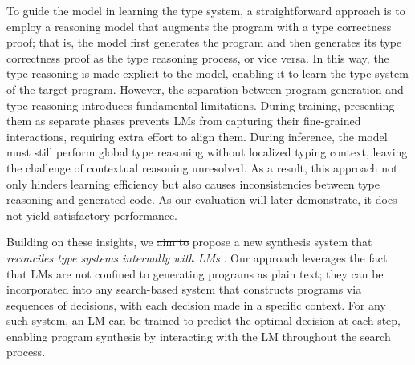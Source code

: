\documentclass[manuscript,screen]{acmart}
\makeatletter
\providecommand{\DIFadd}[1]{{\protect\color{blue}\uwave{#1}}} %
\providecommand{\DIFdel}[1]{{\protect\color{red}\sout{#1}}} %
\providecommand{\DIFaddbegin}{} %
\providecommand{\DIFaddend}{} %
\providecommand{\DIFdelbegin}{} %
\providecommand{\DIFdelend}{} %
\providecommand{\DIFscaledelfig}{0.5}
\newlength{\DIFdelgraphicswidth} %
\newlength{\DIFdelgraphicsheight} %
\providecommand{\DIFaddincludegraphics}[2][]{{\color{blue}\fbox{\DIFOincludegraphics[#1]{#2}}}} %
\providecommand{\DIFdelincludegraphics}[2][]{%
\sbox{\DIFdelgraphicsbox}{\DIFOincludegraphics[#1]{#2}}%
\settoboxwidth{\DIFdelgraphicswidth}{\DIFdelgraphicsbox} %
\settoboxtotalheight{\DIFdelgraphicsheight}{\DIFdelgraphicsbox} %
\scalebox{\DIFscaledelfig}{%
\parbox[b]{\DIFdelgraphicswidth}{\usebox{\DIFdelgraphicsbox}\\[-\baselineskip] \rule{\DIFdelgraphicswidth}{0em}}\llap{\resizebox{\DIFdelgraphicswidth}{\DIFdelgraphicsheight}{%
\setlength{\unitlength}{\DIFdelgraphicswidth}%
\begin{picture}(1,1)%
\thicklines\linethickness{2pt} %
{\color[rgb]{1,0,0}\put(0,0){\framebox(1,1){}}}%
{\color[rgb]{1,0,0}\put(0,0){\line( 1,1){1}}}%
{\color[rgb]{1,0,0}\put(0,1){\line(1,-1){1}}}%
\end{picture}%
}\hspace*{3pt}}} %
} %
\DeclareRobustCommand{\DIFaddbegin}{\DIFOaddbegin \let\includegraphics\DIFaddincludegraphics} %
\DeclareRobustCommand{\DIFaddend}{\DIFOaddend \let\includegraphics\DIFOincludegraphics} %
\DeclareRobustCommand{\DIFdelbegin}{\DIFOdelbegin \let\includegraphics\DIFdelincludegraphics} %
\DeclareRobustCommand{\DIFdelend}{\DIFOaddend \let\includegraphics\DIFOincludegraphics} %
\let\sout@orig\sout %
\renewcommand{\sout}[1]{\ifmmode\text{\sout@orig{\ensuremath{#1}}}\else\sout@orig{#1}\fi} %
\makeatother
\begin{document}
To guide the model in learning the type system, a straightforward approach is to employ a reasoning model that augments the program with a type correctness proof; that is, the model first generates the program and then generates its type correctness proof as the type reasoning process, or vice versa. In this way, the type reasoning is made explicit to the model, enabling it to learn the type system of the target program.
%
However, the separation between program generation and type reasoning introduces fundamental limitations. During training, presenting them as separate phases prevents LMs from capturing their fine-grained interactions, requiring extra effort to align them. During inference, the model must still perform global type reasoning without \DIFaddbegin \DIFadd{a }\DIFaddend localized typing context, leaving the challenge of contextual reasoning unresolved.
%
As a result, this approach not only hinders learning efficiency but also causes inconsistencies between type reasoning and generated code. As our evaluation will later demonstrate, it does not yield satisfactory performance.

Building on these insights, we \DIFdelbegin \DIFdel{aim to }\DIFdelend propose a new synthesis system that \emph{reconciles type systems \DIFdelbegin \DIFdel{internally }\DIFdelend with LMs \DIFaddbegin \DIFadd{internally}\DIFaddend }. 
Our approach leverages the fact that LMs are not confined to generating programs as plain text; they can be incorporated into any search-based system that constructs programs via sequences of decisions, with each decision made in a specific context. 
For any such system, an LM can be trained to predict the optimal decision at each step, enabling program synthesis by interacting with the LM throughout the search process.
\end{document}
